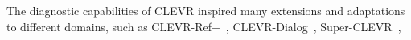 The diagnostic capabilities of CLEVR inspired many extensions and adaptations to different domains, such as CLEVR-Ref+~\cite{liu2019clevr},
CLEVR-Dialog~\cite{kottur2019clevr},
Super-CLEVR~\cite{li2023super},
